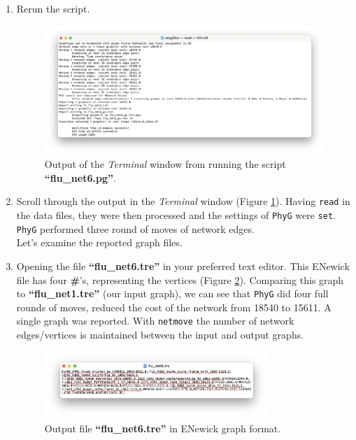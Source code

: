 \documentclass[11pt]{article}
\newcommand{\phyg}{\texttt{PhyG} }
\begin{document}
\begin {enumerate}
\item Rerun the script.

\begin{figure}[H]
\centering
\includegraphics[width=\textwidth]{output5.png}
\caption{Output of the \textit{Terminal} window from running the script 
\textbf{``flu\_net6.pg''}.}
\label{output5}
\end{figure}

\item Scroll through the output in the \textit{Terminal} window (Figure \ref{output5}). 
Having \texttt{read} in the data files, they were then processed and the settings of 
\phyg were \texttt{set}. \phyg performed three round of moves of network edges.\\

Let's examine the reported graph files. 

\item Opening the file \textbf{``flu\_net6.tre''} in your preferred text editor. This 
ENewick file has four \textbf{\#}'s, representing the vertices (Figure \ref{tre6}). 
Comparing this graph to \textbf{``flu\_net1.tre''} (our input graph), we can 
see that \phyg did four full rounds of moves, reduced the cost of the network from 
18540 to 15611. A single graph was reported. With \texttt{netmove} the number of 
network edges/vertices is maintained between the input and output graphs.

\begin{figure}[H]
\centering
\includegraphics[width=0.8\textwidth]{tre6.png}
\caption{Output file \textbf{``flu\_net6.tre''} in ENewick graph format.}
\label{tre6}
\end{figure}


\end{enumerate}
\end{document}
